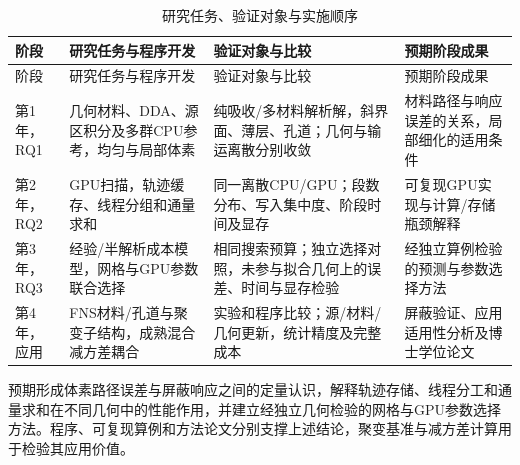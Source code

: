 \documentclass[UTF8, zihao=-4, fontset=none, a4paper]{ctexart}
\begin{document}
\begin{longtable}{@{}>{\raggedright\arraybackslash}p{}>{\raggedright\arraybackslash}p{}>{\raggedright\arraybackslash}p{}>{\raggedright\arraybackslash}p{}@{}}
\caption{研究任务、验证对象与实施顺序}\label{tab:6}\\
\toprule
阶段 & 研究任务与程序开发 & 验证对象与比较 & 预期阶段成果 \\
\midrule
\endfirsthead
\toprule
阶段 & 研究任务与程序开发 & 验证对象与比较 & 预期阶段成果 \\
\midrule
\endhead
\bottomrule
\endlastfoot
第1年，RQ1 & 几何材料、DDA、源区积分及多群CPU参考，均匀与局部体素 & 纯吸收/多材料解析解，斜界面、薄层、孔道；几何与输运离散分别收敛 & 材料路径与响应误差的关系，局部细化的适用条件 \\
第2年，RQ2 & GPU扫描，轨迹缓存、线程分组和通量求和 & 同一离散CPU/GPU；段数分布、写入集中度、阶段时间及显存 & 可复现GPU实现与计算/存储瓶颈解释 \\
第3年，RQ3 & 经验/半解析成本模型，网格与GPU参数联合选择 & 相同搜索预算；独立选择对照，未参与拟合几何上的误差、时间与显存检验 & 经独立算例检验的预测与参数选择方法 \\
第4年，应用 & FNS材料/孔道与聚变子结构，成熟混合减方差耦合 & 实验和程序比较；源/材料/几何更新，统计精度及完整成本 & 屏蔽验证、应用适用性分析及博士学位论文 \\
\end{longtable}

预期形成体素路径误差与屏蔽响应之间的定量认识，解释轨迹存储、线程分工和通量求和在不同几何中的性能作用，并建立经独立几何检验的网格与GPU参数选择方法。程序、可复现算例和方法论文分别支撑上述结论，聚变基准与减方差计算用于检验其应用价值。
\end{document}
